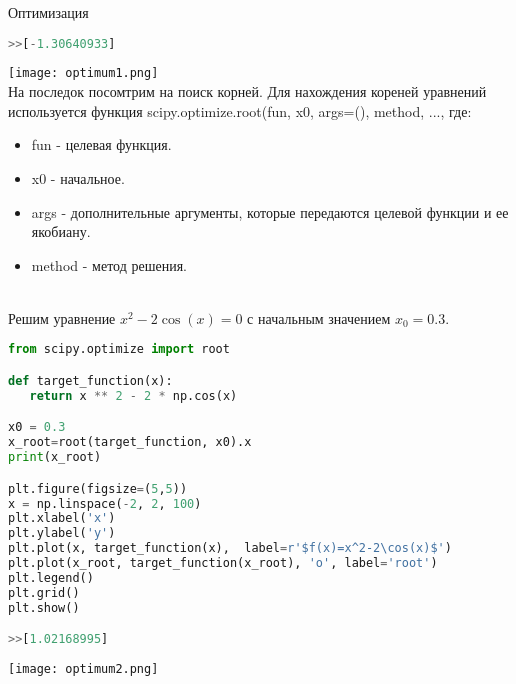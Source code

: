 \documentclass{article}
\begin{document}
\begin{section}{Оптимизация}
\begin{lstlisting}[language=Python]
>>[-1.30640933]
\end{lstlisting}
\texttt{[image: optimum1.png]}
\\
На последок посомтрим на поиск корней. Для нахождения кореней уравнений используется функция scipy.optimize.root(fun, x0, args=(), method, ..., где:
\begin{itemize}
    \item fun - целевая функция.
    \item x0 - начальное.
    \item args - дополнительные аргументы, которые передаются целевой функции и ее якобиану.
    \item method - метод решения.
\end{itemize}
\\
Решим уравнение $x^2-2\cos(x)=0$ с начальным значением $x_0=0.3$.
\\
\begin{lstlisting}[language=Python]
from scipy.optimize import root

def target_function(x):
   return x ** 2 - 2 * np.cos(x)

x0 = 0.3
x_root=root(target_function, x0).x
print(x_root)

plt.figure(figsize=(5,5))
x = np.linspace(-2, 2, 100)
plt.xlabel('x')
plt.ylabel('y')
plt.plot(x, target_function(x),  label=r'$f(x)=x^2-2\cos(x)$')
plt.plot(x_root, target_function(x_root), 'o', label='root')
plt.legend()
plt.grid()
plt.show()

>>[1.02168995]
\end{lstlisting}
\texttt{[image: optimum2.png]}

\end{section}
\end{document}
